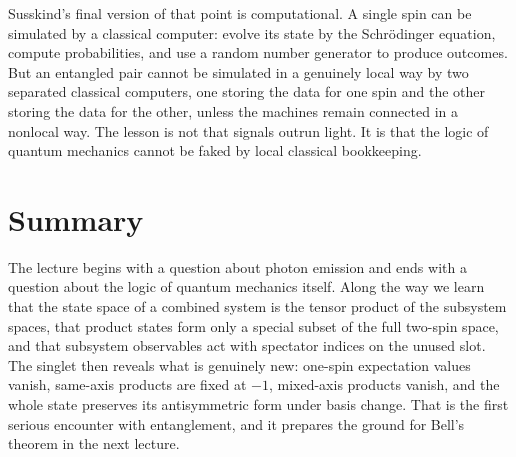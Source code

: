 Susskind's final version of that point is computational. A single spin can be simulated by a classical computer: evolve its state by the Schr\"odinger equation, compute probabilities, and use a random number generator to produce outcomes. But an entangled pair cannot be simulated in a genuinely local way by two separated classical computers, one storing the data for one spin and the other storing the data for the other, unless the machines remain connected in a nonlocal way. The lesson is not that signals outrun light. It is that the logic of quantum mechanics cannot be faked by local classical bookkeeping.

\section{Summary}

The lecture begins with a question about photon emission and ends with a question about the logic of quantum mechanics itself. Along the way we learn that the state space of a combined system is the tensor product of the subsystem spaces, that product states form only a special subset of the full two-spin space, and that subsystem observables act with spectator indices on the unused slot. The singlet then reveals what is genuinely new: one-spin expectation values vanish, same-axis products are fixed at \(-1\), mixed-axis products vanish, and the whole state preserves its antisymmetric form under basis change. That is the first serious encounter with entanglement, and it prepares the ground for Bell's theorem in the next lecture.